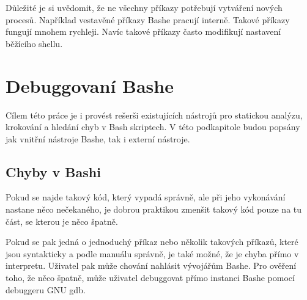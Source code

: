 \documentclass[thesis=M,czech]{FITthesis}[2012/06/26]
\begin{document}
Důležité je si uvědomit, že ne všechny příkazy potřebují vytváření nových procesů. Například vestavěné příkazy Bashe pracují interně. Takové příkazy fungují mnohem rychleji. Navíc takové příkazy často modifikují nastavení běžícího shellu.













%
%
\section{Debuggovaní Bashe} %

Cílem této práce je i provést rešerši existujících nástrojů pro statickou analýzu, krokování a hledání chyb v Bash skriptech. V této podkapitole budou popsány jak vnitřní nástroje Bashe, tak i externí nástroje.


%
\subsection{Chyby v Bashi}

Pokud se najde takový kód, který vypadá správně, ale při jeho vykonávání nastane něco nečekaného, je dobrou praktikou zmenšit takový  kód pouze na tu část, se kterou je něco špatně.

Pokud se pak jedná o jednoduchý příkaz nebo několik takových příkazů, které jsou syntakticky a podle manuálu správně, je také možné, že je chyba přímo v interpretu. Uživatel pak může chování nahlásit vývojářům Bashe. Pro ověření toho, že něco špatně, může uživatel debuggovat přímo instanci Bashe pomocí debuggeru GNU gdb.
\end{document}
